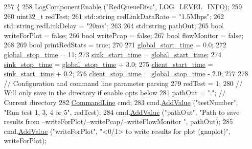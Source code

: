 \begin{DoxyCode}
257 \{
258   \hyperlink{namespacens3_adc4ef4f00bb2f5f4edae67fc3bc27f20}{LogComponentEnable} (\textcolor{stringliteral}{"RedQueueDisc"}, \hyperlink{namespacens3_aa6464a4d69551a9cc968e17a65f39bdbae36aedc880de94fd5a5b53bb9fe65628}{LOG\_LEVEL\_INFO});
259 
260   uint32\_t redTest;
261   std::string redLinkDataRate = \textcolor{stringliteral}{"1.5Mbps"};
262   std::string redLinkDelay = \textcolor{stringliteral}{"20ms"};
263 
264   std::string pathOut;
265   \textcolor{keywordtype}{bool} writeForPlot = \textcolor{keyword}{false};
266   \textcolor{keywordtype}{bool} writePcap = \textcolor{keyword}{false};
267   \textcolor{keywordtype}{bool} flowMonitor = \textcolor{keyword}{false};
268 
269   \textcolor{keywordtype}{bool} printRedStats = \textcolor{keyword}{true};
270 
271   \hyperlink{red-tests_8cc_ab3a0ca969f11332a6b4ca8bc81e19ba7}{global\_start\_time} = 0.0;
272   \hyperlink{red-tests_8cc_a374328526043935f11841a7ec7e396d5}{global\_stop\_time} = 11; 
273   \hyperlink{red-tests_8cc_a2c56dc9b543a4442a7edd8d680c4a1bc}{sink\_start\_time} = \hyperlink{red-tests_8cc_ab3a0ca969f11332a6b4ca8bc81e19ba7}{global\_start\_time};
274   \hyperlink{red-tests_8cc_a2462eef540f5b896f14d4ea7b7bb6214}{sink\_stop\_time} = \hyperlink{red-tests_8cc_a374328526043935f11841a7ec7e396d5}{global\_stop\_time} + 3.0;
275   \hyperlink{red-tests_8cc_a18ff86acaf663200fbedb1f77d03b515}{client\_start\_time} = \hyperlink{red-tests_8cc_a2c56dc9b543a4442a7edd8d680c4a1bc}{sink\_start\_time} + 0.2;
276   \hyperlink{red-tests_8cc_aee714f5dcf74da2f73bcdd66c8a9e265}{client\_stop\_time} = \hyperlink{red-tests_8cc_a374328526043935f11841a7ec7e396d5}{global\_stop\_time} - 2.0;
277 
278   \textcolor{comment}{// Configuration and command line parameter parsing}
279   redTest = 1;
280   \textcolor{comment}{// Will only save in the directory if enable opts below}
281   pathOut = \textcolor{stringliteral}{"."}; \textcolor{comment}{// Current directory}
282   \hyperlink{classns3_1_1CommandLine}{CommandLine} cmd;
283   cmd.\hyperlink{classns3_1_1CommandLine_addcfb546c7ad4c8bd0965654d55beb8e}{AddValue} (\textcolor{stringliteral}{"testNumber"}, \textcolor{stringliteral}{"Run test 1, 3, 4 or 5"}, redTest);
284   cmd.\hyperlink{classns3_1_1CommandLine_addcfb546c7ad4c8bd0965654d55beb8e}{AddValue} (\textcolor{stringliteral}{"pathOut"}, \textcolor{stringliteral}{"Path to save results from --writeForPlot/--writePcap/--writeFlowMonitor
      "}, pathOut);
285   cmd.\hyperlink{classns3_1_1CommandLine_addcfb546c7ad4c8bd0965654d55beb8e}{AddValue} (\textcolor{stringliteral}{"writeForPlot"}, \textcolor{stringliteral}{"<0/1> to write results for plot (gnuplot)"}, writeForPlot);

\end{DoxyCode}
